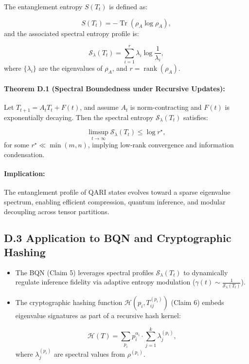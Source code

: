 \documentclass[12pt]{article}
\begin{document}
\begin{itemize}
The entanglement entropy \(S(T_t)\) is defined as:

\[
S(T_t) = -\operatorname{Tr}(\rho_A \log \rho_A),
\]
and the associated spectral entropy profile is:

\[
\mathcal{S}_\lambda(T_t) = \sum_{i=1}^{r} \lambda_i \log \frac{1}{\lambda_i},
\]
where \(\{\lambda_i\}\) are the eigenvalues of \(\rho_A\), and \(r = \operatorname{rank}(\rho_A)\).

\paragraph{Theorem D.1 (Spectral Boundedness under Recursive Updates):}
Let \(T_{t+1} = A_t T_t + F(t)\), and assume \(A_t\) is norm-contracting and \(F(t)\) is exponentially decaying. Then the spectral entropy \(\mathcal{S}_\lambda(T_t)\) satisfies:

\[
\limsup_{t \to \infty} \mathcal{S}_\lambda(T_t) \leq \log r^\star,
\]
for some \(r^\star \ll \min(m, n)\), implying low-rank convergence and information condensation.

\paragraph{Implication:}
The entanglement profile of QARI states evolves toward a sparse eigenvalue spectrum, enabling efficient compression, quantum inference, and modular decoupling across tensor partitions.

\subsection*{D.3 Application to BQN and Cryptographic Hashing}

\begin{itemize}
    \item The BQN (Claim 5) leverages spectral profiles \(\mathcal{S}_\lambda(T_t)\) to dynamically regulate inference fidelity via adaptive entropy modulation (\(\gamma(t) \sim \frac{1}{\mathcal{S}_\lambda(T_t)}\)).
    
    \item The cryptographic hashing function \(\mathcal{H}(p_i, T_{ij}^{(p_i)})\) (Claim 6) embeds eigenvalue signatures as part of a recursive hash kernel:

    \[
    \mathcal{H}(T) = \sum_{p_i} p_i^{\alpha_i} \cdot \sum_{j=1}^{k} \lambda_j^{(p_i)},
    \]
    where \(\lambda_j^{(p_i)}\) are spectral values from \(\rho^{(p_i)}\).
\end{itemize}


\end{itemize}
\end{document}
